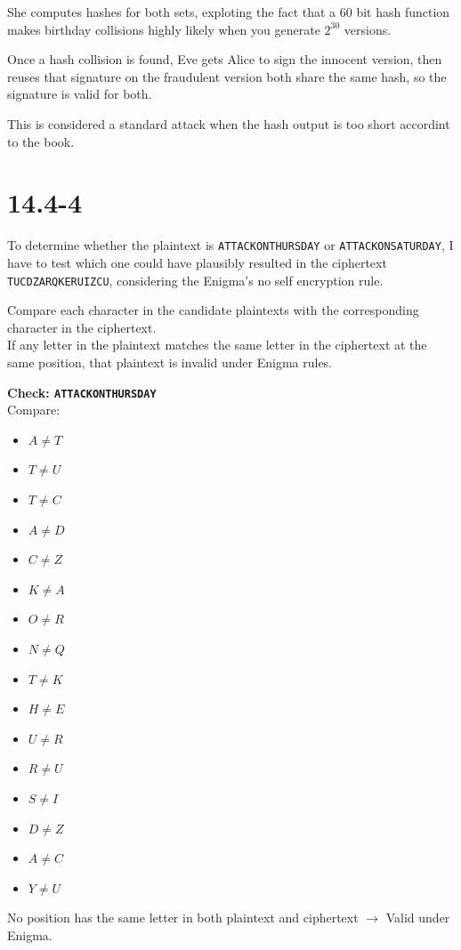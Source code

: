 \documentclass[12pt]{article}
\begin{document}
She computes hashes for both sets, exploting the fact that a 60 bit hash function makes birthday collisions highly likely when you generate \( 2^{30} \) versions.

Once a hash collision is found, Eve gets Alice to sign the innocent version, then reuses that signature on the fraudulent version both share the same hash, so the signature is valid for both.

This is considered a standard attack when the hash output is too short accordint to the book.
\newpage










\section*{14.4-4}


To determine whether the plaintext is \texttt{ATTACKONTHURSDAY} or \texttt{ATTACKONSATURDAY}, I have to test which one could have plausibly resulted in the ciphertext \texttt{TUCDZARQKERUIZCU}, considering the Enigma's no self encryption rule.

Compare each character in the candidate plaintexts with the corresponding character in the ciphertext. \\
If any letter in the plaintext matches the same letter in the ciphertext at the same position, that plaintext is invalid under Enigma rules.

\textbf{Check: \texttt{ATTACKONTHURSDAY}} \\
Compare:
\begin{itemize}
    \item \( A \neq T \)
    \item \( T \neq U \)
    \item \( T \neq C \)
    \item \( A \neq D \)
    \item \( C \neq Z \)
    \item \( K \neq A \)
    \item \( O \neq R \)
    \item \( N \neq Q \)
    \item \( T \neq K \)
    \item \( H \neq E \)
    \item \( U \neq R \)
    \item \( R \neq U \)
    \item \( S \neq I \)
    \item \( D \neq Z \)
    \item \( A \neq C \)
    \item \( Y \neq U \)
\end{itemize}
No position has the same letter in both plaintext and ciphertext \( \rightarrow \) Valid under Enigma.
\end{document}
